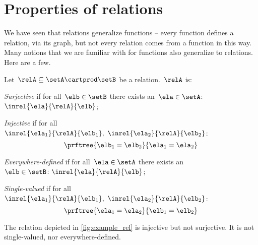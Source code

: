 

\section{Properties of relations}

We have seen that relations generalize functions -- every function defines a relation, via its graph, but not every relation comes from a function in this way.
Many notions that we are familiar with for functions also generalize to relations.
Here are a few.
\begin{definition}
    \label{def:rel_properties}
    Let~$\relA\subseteq \setA \cartprod \setB$ be a relation.~$\relA$ is:
    \begin{compactenum}
        \item \emph{Surjective} if for all~$\elb\in \setB$ there exists an~$\ela\in \setA$:~$\inrel{\ela}{\relA}{\elb}$;
        \item \emph{Injective} if for all~$\inrel{\ela_1}{\relA}{\elb_1},~\inrel{\ela_2}{\relA}{\elb_2}$:
        \begin{equation*}
            \prftree{\elb_1=\elb_2}{\ela_1=\ela_2}
        \end{equation*}
        \item \emph{Everywhere-defined} if for all~$\ela\in \setA$ there exists an ~$\elb \in \setB\colon \inrel{\ela}{\relA}{\elb}$;
        \item \emph{Single-valued} if for all~$\inrel{\ela_1}{\relA}{\elb_1},~\inrel{\ela_2}{\relA}{\elb_2}$:
        \begin{equation*}
            \prftree{\ela_1=\ela_2}{\elb_1=\elb_2}
        \end{equation*}
    \end{compactenum}
\end{definition}

\begin{example}
    The relation depicted in \cref{fig:example_rel} is injective but not surjective.
    It is not single-valued, nor everywhere-defined.
\end{example}

